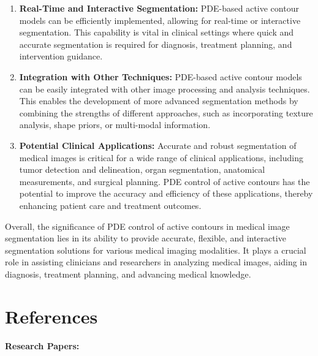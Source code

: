 \documentclass[]{report}
\begin{document}
\begin{enumerate}
    \item \textbf{Real-Time and Interactive Segmentation:} PDE-based active contour models can be efficiently implemented, allowing for real-time or interactive segmentation. This capability is vital in clinical settings where quick and accurate segmentation is required for diagnosis, treatment planning, and intervention guidance.

    \item \textbf{Integration with Other Techniques:} PDE-based active contour models can be easily integrated with other image processing and analysis techniques. This enables the development of more advanced segmentation methods by combining the strengths of different approaches, such as incorporating texture analysis, shape priors, or multi-modal information.

    \item \textbf{Potential Clinical Applications:} Accurate and robust segmentation of medical images is critical for a wide range of clinical applications, including tumor detection and delineation, organ segmentation, anatomical measurements, and surgical planning. PDE control of active contours has the potential to improve the accuracy and efficiency of these applications, thereby enhancing patient care and treatment outcomes.
\end{enumerate}

Overall, the significance of PDE control of active contours in medical image segmentation lies in its ability to provide accurate, flexible, and interactive segmentation solutions for various medical imaging modalities. It plays a crucial role in assisting clinicians and researchers in analyzing medical images, aiding in diagnosis, treatment planning, and advancing medical knowledge.

\chapter*{References}

\textbf{Research Papers:}
\end{document}
